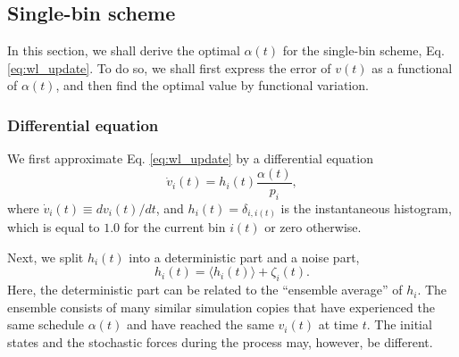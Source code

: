 \documentclass[reprint]{revtex4-1}
\begin{document}



\subsection{\label{sec:single-bin}
Single-bin scheme}



In this section,
we shall derive the optimal $\alpha(t)$
for the single-bin scheme,
Eq. \eqref{eq:wl_update}.
%
To do so,
we shall first express the error of $v(t)$
as a functional of $\alpha(t)$,
and then find the optimal value
by functional variation.



\subsubsection{Differential equation}



We first approximate Eq. \eqref{eq:wl_update}
by a differential equation
%
\begin{equation}
  \dot v_i(t)
  =
  h_i(t) \frac{ \alpha(t) } { p_i },
  \label{eq:vt_diffeq}
\end{equation}
%
where
$\dot v_i(t) \equiv dv_i(t)/dt$,
%
and $h_i(t) = \delta_{i, i(t)}$
is the instantaneous histogram,
which is equal to $1.0$
for the current bin $i(t)$
or zero otherwise.



Next, we split $h_i(t)$ into a deterministic part
and a noise part,
%
\begin{equation}
  h_i(t) = \langle h_i(t) \rangle + \zeta_i(t).
  \label{eq:h_split}
\end{equation}
%
Here, the deterministic part can be related
to the ``ensemble average'' of $h_i$.
%
The ensemble consists of many similar simulation copies
that have experienced the same schedule $\alpha(t)$
and have reached the same $v_i(t)$
at time $t$.
%
The initial states and the stochastic forces
during the process may, however, be different.
\end{document}
